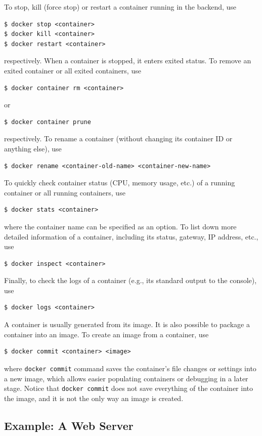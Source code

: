 To stop, kill (force stop) or restart a container running in the backend, use
\begin{lstlisting}
$ docker stop <container>
$ docker kill <container>
$ docker restart <container>
\end{lstlisting}
respectively. When a container is stopped, it enters exited status. To remove an exited container or all exited containers, use
\begin{lstlisting}
$ docker container rm <container>
\end{lstlisting}
or
\begin{lstlisting}
$ docker container prune
\end{lstlisting}
respectively. To rename a container (without changing its container ID or anything else), use
\begin{lstlisting}
$ docker rename <container-old-name> <container-new-name>
\end{lstlisting}

To quickly check container status (CPU, memory usage, etc.) of a running container or all running containers, use
\begin{lstlisting}
$ docker stats <container>
\end{lstlisting}
where the container name can be specified as an option. To list down more detailed information of a container, including its status, gateway, IP address, etc., use
\begin{lstlisting}
$ docker inspect <container>
\end{lstlisting}
Finally, to check the logs of a container (e.g., its standard output to the console), use
\begin{lstlisting}
$ docker logs <container>
\end{lstlisting}

A container is usually generated from its image. It is also possible to package a container into an image. To create an image from a container, use
\begin{lstlisting}
$ docker commit <container> <image>
\end{lstlisting}
where \verb|docker commit| command saves the container's file changes or settings into a new image, which allows easier populating containers or debugging in a later stage. Notice that \verb|docker commit| does not save everything of the container into the image, and it is not the only way an image is created.

\subsection{Example: A Web Server}

